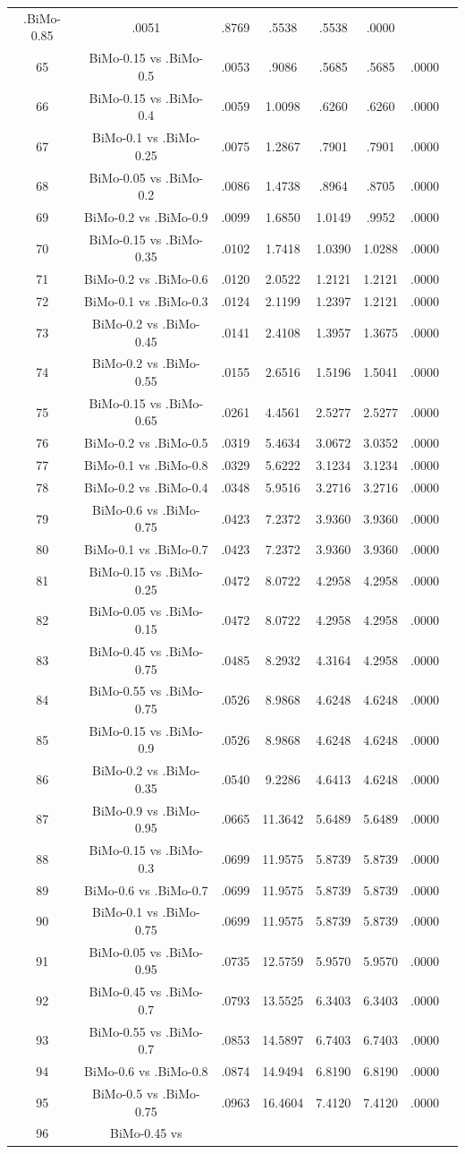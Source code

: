 \documentclass[a4paper,10pt]{article}
\begin{document}
\begin{landscape}
\begin{table}[!htp]
\begin{tabular}{cccccccc}
.BiMo-0.85&.0051&.8769&.5538&.5538&.0000\\65&BiMo-0.15 vs .BiMo-0.5&.0053&.9086&.5685&.5685&.0000\\66&BiMo-0.15 vs .BiMo-0.4&.0059&1.0098&.6260&.6260&.0000\\67&BiMo-0.1 vs .BiMo-0.25&.0075&1.2867&.7901&.7901&.0000\\68&BiMo-0.05 vs .BiMo-0.2&.0086&1.4738&.8964&.8705&.0000\\69&BiMo-0.2 vs .BiMo-0.9&.0099&1.6850&1.0149&.9952&.0000\\70&BiMo-0.15 vs .BiMo-0.35&.0102&1.7418&1.0390&1.0288&.0000\\71&BiMo-0.2 vs .BiMo-0.6&.0120&2.0522&1.2121&1.2121&.0000\\72&BiMo-0.1 vs .BiMo-0.3&.0124&2.1199&1.2397&1.2121&.0000\\73&BiMo-0.2 vs .BiMo-0.45&.0141&2.4108&1.3957&1.3675&.0000\\74&BiMo-0.2 vs .BiMo-0.55&.0155&2.6516&1.5196&1.5041&.0000\\75&BiMo-0.15 vs .BiMo-0.65&.0261&4.4561&2.5277&2.5277&.0000\\76&BiMo-0.2 vs .BiMo-0.5&.0319&5.4634&3.0672&3.0352&.0000\\77&BiMo-0.1 vs .BiMo-0.8&.0329&5.6222&3.1234&3.1234&.0000\\78&BiMo-0.2 vs .BiMo-0.4&.0348&5.9516&3.2716&3.2716&.0000\\79&BiMo-0.6 vs .BiMo-0.75&.0423&7.2372&3.9360&3.9360&.0000\\80&BiMo-0.1 vs .BiMo-0.7&.0423&7.2372&3.9360&3.9360&.0000\\81&BiMo-0.15 vs .BiMo-0.25&.0472&8.0722&4.2958&4.2958&.0000\\82&BiMo-0.05 vs .BiMo-0.15&.0472&8.0722&4.2958&4.2958&.0000\\83&BiMo-0.45 vs .BiMo-0.75&.0485&8.2932&4.3164&4.2958&.0000\\84&BiMo-0.55 vs .BiMo-0.75&.0526&8.9868&4.6248&4.6248&.0000\\85&BiMo-0.15 vs .BiMo-0.9&.0526&8.9868&4.6248&4.6248&.0000\\86&BiMo-0.2 vs .BiMo-0.35&.0540&9.2286&4.6413&4.6248&.0000\\87&BiMo-0.9 vs .BiMo-0.95&.0665&11.3642&5.6489&5.6489&.0000\\88&BiMo-0.15 vs .BiMo-0.3&.0699&11.9575&5.8739&5.8739&.0000\\89&BiMo-0.6 vs .BiMo-0.7&.0699&11.9575&5.8739&5.8739&.0000\\90&BiMo-0.1 vs .BiMo-0.75&.0699&11.9575&5.8739&5.8739&.0000\\91&BiMo-0.05 vs .BiMo-0.95&.0735&12.5759&5.9570&5.9570&.0000\\92&BiMo-0.45 vs .BiMo-0.7&.0793&13.5525&6.3403&6.3403&.0000\\93&BiMo-0.55 vs .BiMo-0.7&.0853&14.5897&6.7403&6.7403&.0000\\94&BiMo-0.6 vs .BiMo-0.8&.0874&14.9494&6.8190&6.8190&.0000\\95&BiMo-0.5 vs .BiMo-0.75&.0963&16.4604&7.4120&7.4120&.0000\\96&BiMo-0.45 vs 
\end{tabular}
\end{table}
\end{landscape}
\end{document}

